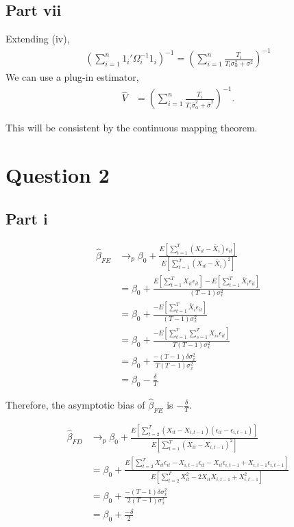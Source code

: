 \documentclass[11pt]{article} %
\begin{document}
\subsection{Part vii}

Extending (iv),
\begin{align*}
\left( \sum_{i=1}^n 1_i'\Omega_i^{-1}1_i\right)^{-1} = \left( \sum_{i=1}^n \frac{T_i}{T_i\sigma_{\alpha}^2 + \sigma^2} \right)^{-1}
\end{align*}
We can use a plug-in estimator,
\begin{align*}
\hat{V} &= \left( \sum_{i=1}^n \frac{T_i}{T_i\hat{\sigma}_{\alpha}^2 + \hat{\sigma}^2} \right)^{-1}.
\end{align*}

This will be consistent by the continuous mapping theorem.
\section{Question 2}
\subsection{Part i}
\begin{align*}
\hat{\beta}_{FE} &\rightarrow_p \beta_0 + \frac{E[\sum_{t=1}^T (X_{it} - \bar{X}_i)\epsilon_{it}]}{E[\sum_{t=1}^T(X_{it} - \bar{X}_i)^2]}\\
&=  \beta_0 + \frac{E[\sum_{t=1}^T X_{it}\epsilon_{it}] - E[\sum_{t=1}^T\bar{X}_i\epsilon_{it}]}{(T-1)\sigma_x^2} \\
&=  \beta_0 + \frac{- E[\sum_{t=1}^T\bar{X}_i\epsilon_{it}]}{(T-1)\sigma_x^2} \\
&= \beta_0 + \frac{- E[\sum_{t=1}^T\sum_{s=1}^TX_{is}\epsilon_{it}]}{T(T-1)\sigma_x^2}\\ 
&= \beta_0 + \frac{- (T-1)\delta\sigma^2_x}{T(T-1)\sigma_x^2}\\
&= \beta_0 - \frac{\delta}{T}
\end{align*}

Therefore, the asymptotic bias of $\hat{\beta}_{FE}$ is $-\frac{\delta}{T}$.

\begin{align*}
\hat{\beta}_{FD} &\rightarrow_p \beta_0 + \frac{E[\sum_{t=2}^T (X_{it} - X_{i,t-1})(\epsilon_{it} - \epsilon_{i,t-1})]}{E[\sum_{t=1}^T(X_{it} - X_{i,t-1})^2]}\\
&= \beta_0 + \frac{E[\sum_{t=2}^T X_{it}\epsilon_{it} - X_{i,t-1}\epsilon_{it} -X_{it}\epsilon_{i,t-1} + X_{i,t-1}\epsilon_{i,t-1} ]}{E[\sum_{t=2}^TX^2_{it} - 2X_{it}X_{i,t-1} + X_{i,t-1}^2]}\\
&= \beta_0 + \frac{-(T-1)\delta \sigma_{x}^2  }{2(T-1)\sigma_x^2}\\
&= \beta_0 + \frac{-\delta  }{2}
\end{align*}
\end{document}
